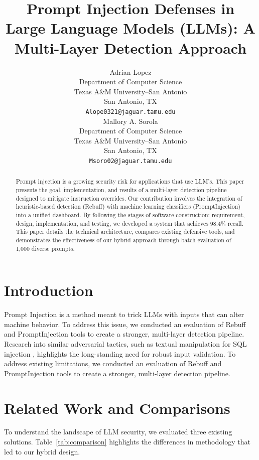 \documentclass{article}
\title{Prompt Injection Defenses in Large Language Models (LLMs): A Multi-Layer Detection Approach}
\author{
  Adrian Lopez \\
  Department of Computer Science \\
  Texas A\&M University--San Antonio \\
  San Antonio, TX \\
  \texttt{Alope0321@jaguar.tamu.edu} \\
  \And
  Mallory A. Sorola \\
  Department of Computer Science \\
  Texas A\&M University--San Antonio \\
  San Antonio, TX \\
  \texttt{Msoro02@jaguar.tamu.edu} \\
}
\begin{document}
\maketitle

\begin{abstract}
Prompt injection is a growing security risk for applications that use LLM's. This paper presents the goal, implementation, and results of a multi-layer detection pipeline designed to mitigate instruction overrides. Our contribution involves the integration of heuristic-based detection (Rebuff) with machine learning classifiers (PromptInjection) into a unified dashboard. By following the stages of software construction: requirement, design, implementation, and testing, we developed a system that achieves 98.4\% recall. This paper details the technical architecture, compares existing defensive tools, and demonstrates the effectiveness of our hybrid approach through batch evaluation of 1,000 diverse prompts.
\end{abstract}


\section{Introduction}
Prompt Injection is a method meant to trick LLMs with inputs that can alter machine behavior. To address this issue, we conducted an evaluation of Rebuff and PromptInjection tools to create a stronger, multi-layer detection pipeline. Research into similar adversarial tactics, such as textual manipulation for SQL injection \cite{alsmadi2014}, highlights the long-standing need for robust input validation. To address existing limitations, we conducted an evaluation of Rebuff and PromptInjection tools to create a stronger, multi-layer detection pipeline.

\section{Related Work and Comparisons}
To understand the landscape of LLM security, we evaluated three existing solutions. Table~\ref{tab:comparison} highlights the differences in methodology that led to our hybrid design.
\end{document}
